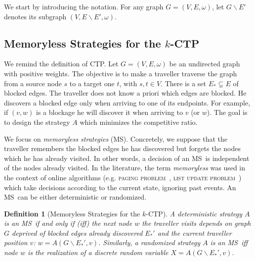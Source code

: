 \documentclass[preprint]{elsarticle}
\newtheorem{definition}{Definition}
\newcommand{\kctp}{$k$-CTP}
\newcommand{\stpath}{$(s,t)$-path}
\newcommand{\mts}{MS}
\begin{document}
We start by introducing the notation. For any graph $G=\left(V,E,\omega\right)$, let $G\backslash E'$ denotes its subgraph $\left(V,E\backslash E',\omega\right)$. 

\subsection{Memoryless Strategies for the \kctp} \label{subsec:msintro}

We remind the definition of CTP. Let $G=\left(V,E,\omega\right)$ be an undirected graph with positive weights. The objective is to make a traveller traverse the graph from a source node $s$ to a target one $t$, with $s,t \in V$. There is a set $E_* \subsetneq E$ of blocked edges. %
The traveller does not know a priori which edges are blocked. He discovers a blocked edge only when arriving to one of its endpoints. For example, if $\left(v,w\right)$ is a blockage he will discover it when arriving to $v$ (or $w$). The goal is to design the strategy $A$ which minimizes the competitive ratio.

We focus on \textit{memoryless strategies} (\mts). Concretely, we suppose that the traveller remembers the blocked edges he has discovered but forgets the nodes which he has already visited. In other words, a decision of an \mts ~is independent of the nodes already visited. In the literature, the term \textit{memoryless} was used in the context of online algorithms (e.g. \textsc{paging problem}~\cite{BoEl98}, \textsc{list update problem}~\cite{Al03}) which take decisions according to the current state, ignoring past events. An \mts ~can be either deterministic or randomized.



\begin{definition}[Memoryless Strategies for the \kctp]
A deterministic strategy $A$ is an \mts ~if and only if (iff) the next node $w$ the traveller visits depends on graph $G$ deprived of blocked edges already discovered $E_*'$ and the current traveller position $v$: $w = A\left(G\backslash E_*',v\right)$. Similarly, a randomized strategy $A$ is an \mts ~iff node $w$ is the realization of a discrete random variable $X = A\left(G\backslash E_*',v\right)$.
\end{definition}
\end{document}
